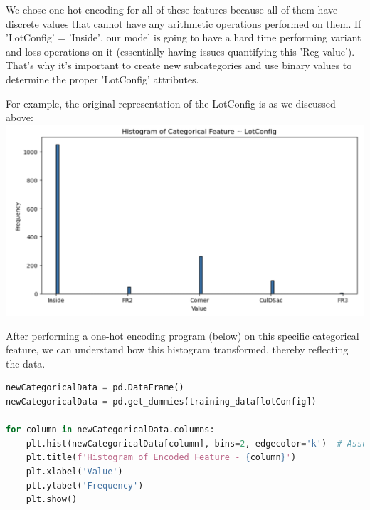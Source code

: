 \documentclass[10pt, a4paper]{article}
\begin{document}
We chose one-hot encoding for all of these features because all of them have discrete values that cannot have any arithmetic operations performed on them. If 'LotConfig'  = 'Inside', our model is going to have a hard time performing variant and loss operations on it (essentially having issues quantifying this 'Reg value'). That's why it's important to create new subcategories and use binary values to determine the proper 'LotConfig' attributes. 

For example, the original representation of the LotConfig is as we discussed above: 
\includegraphics[max width=\textwidth, scale=1.0]{HW1/images/img5.png}

After performing a one-hot encoding program (below) on this specific categorical feature, we can understand how this histogram transformed, thereby reflecting the data. 

\begin{lstlisting}[language=Python]
newCategoricalData = pd.DataFrame()
newCategoricalData = pd.get_dummies(training_data[lotConfig])

for column in newCategoricalData.columns:
    plt.hist(newCategoricalData[column], bins=2, edgecolor='k')  # Assuming binary encoded (0s and 1s)
    plt.title(f'Histogram of Encoded Feature - {column}')
    plt.xlabel('Value')
    plt.ylabel('Frequency')
    plt.show()
\end{lstlisting}
\end{document}
